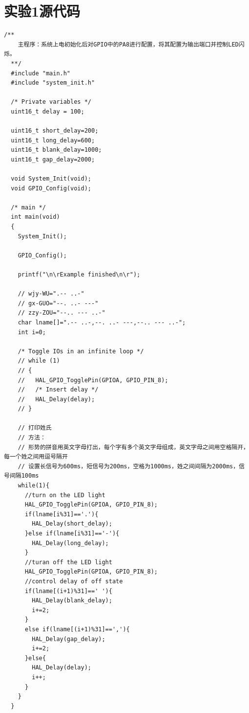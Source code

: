 ﻿\documentclass[UTF8,12pt]{article}
\begin{document}
\section{实验1源代码}
\begin{lstlisting}[frame=shadowbox]
    /**
    主程序：系统上电初始化后对GPIO中的PA8进行配置，将其配置为输出端口并控制LED闪烁。
  **/
  #include "main.h"
  #include "system_init.h"
  
  /* Private variables */
  uint16_t delay = 100;
  
  uint16_t short_delay=200;
  uint16_t long_delay=600;
  uint16_t blank_delay=1000;
  uint16_t gap_delay=2000;
  
  void System_Init(void);
  void GPIO_Config(void);
  
  /* main */
  int main(void)
  {
    System_Init();
    
    GPIO_Config();
    
    printf("\n\rExample finished\n\r");
  
    // wjy-WU=".-- ..-"
    // gx-GUO="--. ..- ---"
    // zzy-ZOU="--.. --- ..-"
    char lname[]=".-- ..-,--. ..- ---,--.. --- ..-";
    int i=0;
  
    /* Toggle IOs in an infinite loop */
    // while (1)
    // {
    //   HAL_GPIO_TogglePin(GPIOA, GPIO_PIN_8);
    //   /* Insert delay */
    //   HAL_Delay(delay);
    // }
  
    // 打印姓氏
    // 方法：
    // 形势的拼音用英文字母打出，每个字有多个英文字母组成，英文字母之间用空格隔开，每一个姓之间用逗号隔开
    // 设置长信号为600ms，短信号为200ms，空格为1000ms，姓之间间隔为2000ms，信号间隔100ms
    while(1){
      //turn on the LED light
      HAL_GPIO_TogglePin(GPIOA, GPIO_PIN_8);
      if(lname[i%31]=='.'){
        HAL_Delay(short_delay);
      }else if(lname[i%31]=='-'){
        HAL_Delay(long_delay);
      }
      //turan off the LED light
      HAL_GPIO_TogglePin(GPIOA, GPIO_PIN_8);
      //control delay of off state
      if(lname[(i+1)%31]==' '){
        HAL_Delay(blank_delay);
        i+=2;
      }
      else if(lname[(i+1)%31]==','){
        HAL_Delay(gap_delay);
        i+=2;
      }else{
        HAL_Delay(delay);
        i++;
      }
    }
  }  
\end{lstlisting}
\end{document}
